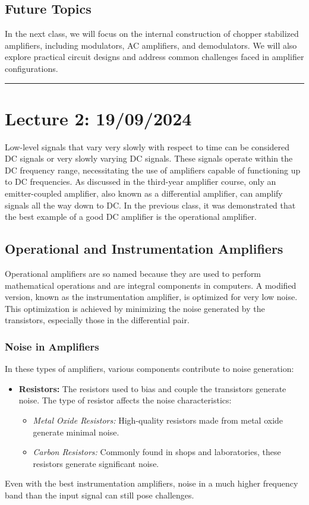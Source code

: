 \documentclass[a4paper,9pt,twoside,openany,twocolumn]{memoir}
\begin{document}
\subsection{Future Topics}

In the next class, we will focus on the internal construction of chopper stabilized amplifiers, including modulators, AC amplifiers, and demodulators. We will also explore practical circuit designs and address common challenges faced in amplifier configurations.
\begin{center}\rule{0.5\linewidth}{0.5pt}\end{center}

\section*{Lecture 2: 19/09/2024}
Low-level signals that vary very slowly with respect to time can be considered DC signals or very slowly varying DC signals. These signals operate within the DC frequency range, necessitating the use of amplifiers capable of functioning up to DC frequencies. As discussed in the third-year amplifier course, only an emitter-coupled amplifier, also known as a differential amplifier, can amplify signals all the way down to DC. In the previous class, it was demonstrated that the best example of a good DC amplifier is the operational amplifier.

\subsection{Operational and Instrumentation Amplifiers}
Operational amplifiers are so named because they are used to perform mathematical operations and are integral components in computers. A modified version, known as the instrumentation amplifier, is optimized for very low noise. This optimization is achieved by minimizing the noise generated by the transistors, especially those in the differential pair.

\subsubsection{Noise in Amplifiers}
In these types of amplifiers, various components contribute to noise generation:
\begin{itemize}
    \item \textbf{Resistors:} The resistors used to bias and couple the transistors generate noise. The type of resistor affects the noise characteristics:
    \begin{itemize}
        \item \textit{Metal Oxide Resistors:} High-quality resistors made from metal oxide generate minimal noise.
        \item \textit{Carbon Resistors:} Commonly found in shops and laboratories, these resistors generate significant noise.
    \end{itemize}
\end{itemize}
Even with the best instrumentation amplifiers, noise in a much higher frequency band than the input signal can still pose challenges.
\end{document}
